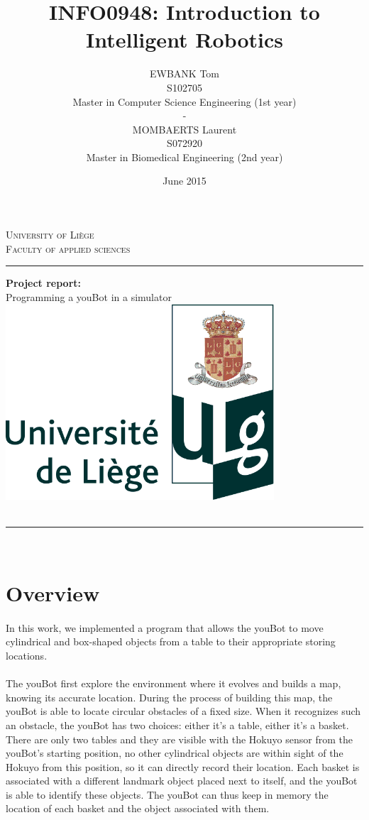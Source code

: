 \documentclass[12pt,a4paper]{article}
\author{EWBANK Tom \\S102705\\Master in Computer Science Engineering (1st year)\\-\\MOMBAERTS Laurent\\S072920\\Master in Biomedical Engineering (2nd year)}
\title{INFO0948: Introduction to Intelligent Robotics}
\date{June 2015}
\begin{document}
\makeatletter
  \begin{titlepage}
  \centering
      {\large \textsc{University of Liège}}\\
      \textsc{Faculty of applied sciences}\\
      \vspace*{0.5cm}
      \hrule
    \vfill    
    	{\LARGE \textbf{Project report:\\}}
    	{\LARGE Programming a youBot in a simulator}
    \vfill
      \includegraphics[width=10cm]{logo_ulg.png}
     \vfill
      {\large \@title \\ \  \\ \large \@date}
      
    \vfill
    \hrule
        {\large \@author} \\
  \end{titlepage}
\makeatother

\tableofcontents
\newpage

\section{Overview}

\paragraph{}
In this work, we implemented a program that allows the 
youBot to move cylindrical and box-shaped objects from a table to their 
appropriate storing locations. 

\paragraph{}
The youBot first explore the environment where it 
evolves and builds a map, knowing its accurate 
location. During the process of building this map, the 
youBot is able to locate circular obstacles of a fixed 
size. When it recognizes such an obstacle, the youBot 
has two choices: either it's a table, either it's a 
basket. There are only two tables and they are visible 
with the Hokuyo sensor from the youBot's starting 
position, no other cylindrical objects are within sight 
of the Hokuyo from this position, so 
it can directly record their location. Each basket is 
associated with a different landmark object placed next 
to itself, and the youBot is able to identify these 
objects. The youBot can thus keep in memory the location 
of each basket and the object associated with them.
\end{document}
